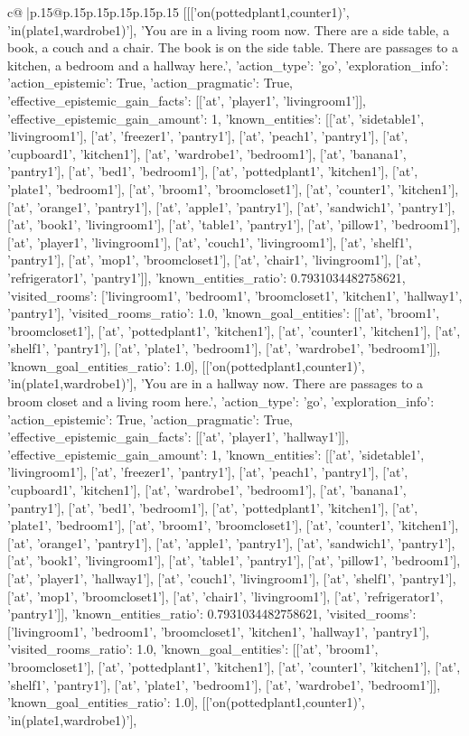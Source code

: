 \documentclass{article}
\begin{document}
{\begin{supertabular}{c@{$\;$}|p{.15\linewidth}@{}p{.15\linewidth}p{.15\linewidth}p{.15\linewidth}p{.15\linewidth}p{.15\linewidth}}
{{{	 [[['on(pottedplant1,counter1)', 'in(plate1,wardrobe1)'], 'You are in a living room now. There are a side table, a book, a couch and a chair. The book is on the side table. There are passages to a kitchen, a bedroom and a hallway here.', {'action_type': 'go', 'exploration_info': {'action_epistemic': True, 'action_pragmatic': True, 'effective_epistemic_gain_facts': [['at', 'player1', 'livingroom1']], 'effective_epistemic_gain_amount': 1, 'known_entities': [['at', 'sidetable1', 'livingroom1'], ['at', 'freezer1', 'pantry1'], ['at', 'peach1', 'pantry1'], ['at', 'cupboard1', 'kitchen1'], ['at', 'wardrobe1', 'bedroom1'], ['at', 'banana1', 'pantry1'], ['at', 'bed1', 'bedroom1'], ['at', 'pottedplant1', 'kitchen1'], ['at', 'plate1', 'bedroom1'], ['at', 'broom1', 'broomcloset1'], ['at', 'counter1', 'kitchen1'], ['at', 'orange1', 'pantry1'], ['at', 'apple1', 'pantry1'], ['at', 'sandwich1', 'pantry1'], ['at', 'book1', 'livingroom1'], ['at', 'table1', 'pantry1'], ['at', 'pillow1', 'bedroom1'], ['at', 'player1', 'livingroom1'], ['at', 'couch1', 'livingroom1'], ['at', 'shelf1', 'pantry1'], ['at', 'mop1', 'broomcloset1'], ['at', 'chair1', 'livingroom1'], ['at', 'refrigerator1', 'pantry1']], 'known_entities_ratio': 0.7931034482758621, 'visited_rooms': ['livingroom1', 'bedroom1', 'broomcloset1', 'kitchen1', 'hallway1', 'pantry1'], 'visited_rooms_ratio': 1.0, 'known_goal_entities': [['at', 'broom1', 'broomcloset1'], ['at', 'pottedplant1', 'kitchen1'], ['at', 'counter1', 'kitchen1'], ['at', 'shelf1', 'pantry1'], ['at', 'plate1', 'bedroom1'], ['at', 'wardrobe1', 'bedroom1']], 'known_goal_entities_ratio': 1.0}}], [['on(pottedplant1,counter1)', 'in(plate1,wardrobe1)'], 'You are in a hallway now. There are passages to a broom closet and a living room here.', {'action_type': 'go', 'exploration_info': {'action_epistemic': True, 'action_pragmatic': True, 'effective_epistemic_gain_facts': [['at', 'player1', 'hallway1']], 'effective_epistemic_gain_amount': 1, 'known_entities': [['at', 'sidetable1', 'livingroom1'], ['at', 'freezer1', 'pantry1'], ['at', 'peach1', 'pantry1'], ['at', 'cupboard1', 'kitchen1'], ['at', 'wardrobe1', 'bedroom1'], ['at', 'banana1', 'pantry1'], ['at', 'bed1', 'bedroom1'], ['at', 'pottedplant1', 'kitchen1'], ['at', 'plate1', 'bedroom1'], ['at', 'broom1', 'broomcloset1'], ['at', 'counter1', 'kitchen1'], ['at', 'orange1', 'pantry1'], ['at', 'apple1', 'pantry1'], ['at', 'sandwich1', 'pantry1'], ['at', 'book1', 'livingroom1'], ['at', 'table1', 'pantry1'], ['at', 'pillow1', 'bedroom1'], ['at', 'player1', 'hallway1'], ['at', 'couch1', 'livingroom1'], ['at', 'shelf1', 'pantry1'], ['at', 'mop1', 'broomcloset1'], ['at', 'chair1', 'livingroom1'], ['at', 'refrigerator1', 'pantry1']], 'known_entities_ratio': 0.7931034482758621, 'visited_rooms': ['livingroom1', 'bedroom1', 'broomcloset1', 'kitchen1', 'hallway1', 'pantry1'], 'visited_rooms_ratio': 1.0, 'known_goal_entities': [['at', 'broom1', 'broomcloset1'], ['at', 'pottedplant1', 'kitchen1'], ['at', 'counter1', 'kitchen1'], ['at', 'shelf1', 'pantry1'], ['at', 'plate1', 'bedroom1'], ['at', 'wardrobe1', 'bedroom1']], 'known_goal_entities_ratio': 1.0}}], [['on(pottedplant1,counter1)', 'in(plate1,wardrobe1)'], }}}
\end{supertabular}}
\end{document}
